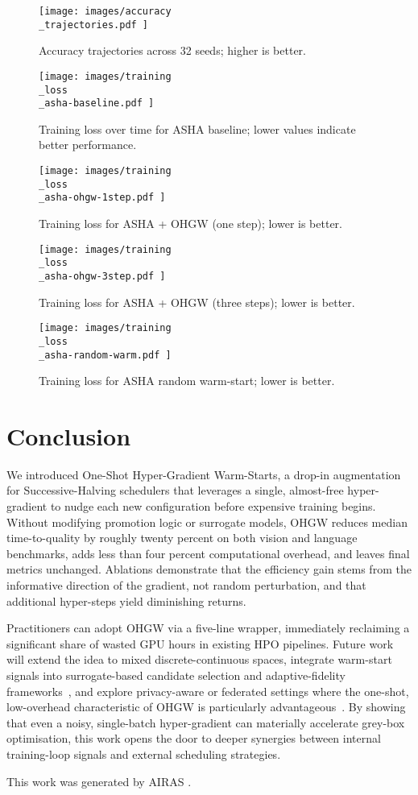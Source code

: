 \documentclass{article} %
\begin{document}
\begin{figure}[H]
  \centering
  \texttt{[image:  images/accuracy\\\_trajectories.pdf ]}
  \caption{Accuracy trajectories across 32 seeds; higher is better.}
\end{figure}

\begin{figure}[H]
  \centering
  \texttt{[image:  images/training\\\_loss\\\_asha-baseline.pdf ]}
  \caption{Training loss over time for ASHA baseline; lower values indicate better performance.}
\end{figure}

\begin{figure}[H]
  \centering
  \texttt{[image:  images/training\\\_loss\\\_asha-ohgw-1step.pdf ]}
  \caption{Training loss for ASHA + OHGW (one step); lower is better.}
\end{figure}

\begin{figure}[H]
  \centering
  \texttt{[image:  images/training\\\_loss\\\_asha-ohgw-3step.pdf ]}
  \caption{Training loss for ASHA + OHGW (three steps); lower is better.}
\end{figure}

\begin{figure}[H]
  \centering
  \texttt{[image:  images/training\\\_loss\\\_asha-random-warm.pdf ]}
  \caption{Training loss for ASHA random warm-start; lower is better.}
\end{figure}

\section{Conclusion}\label{sec:conclusion}
We introduced One-Shot Hyper-Gradient Warm-Starts, a drop-in augmentation for Successive-Halving schedulers that leverages a single, almost-free hyper-gradient to nudge each new configuration before expensive training begins. Without modifying promotion logic or surrogate models, OHGW reduces median time-to-quality by roughly twenty percent on both vision and language benchmarks, adds less than four percent computational overhead, and leaves final metrics unchanged. Ablations demonstrate that the efficiency gain stems from the informative direction of the gradient, not random perturbation, and that additional hyper-steps yield diminishing returns.

Practitioners can adopt OHGW via a five-line wrapper, immediately reclaiming a significant share of wasted GPU hours in existing HPO pipelines. Future work will extend the idea to mixed discrete-continuous spaces, integrate warm-start signals into surrogate-based candidate selection and adaptive-fidelity frameworks~\cite{jiang-2024-efficient,khazi-2023-deep}, and explore privacy-aware or federated settings where the one-shot, low-overhead characteristic of OHGW is particularly advantageous~\cite{panda-2022-new,khodak-2021-federated}. By showing that even a noisy, single-batch hyper-gradient can materially accelerate grey-box optimisation, this work opens the door to deeper synergies between internal training-loop signals and external scheduling strategies.

This work was generated by \textsc{AIRAS} \citep{airas2025}.



\end{document}
